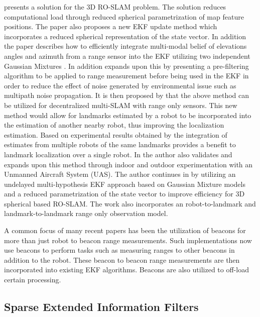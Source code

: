 \documentclass[conference]{IEEEtran}
\begin{document}
	
	
	\cite{Fabresse2013} presents a solution for the 3D RO-SLAM problem. The solution reduces computational load through reduced spherical parametrization of map feature positions. The paper also proposes a new EKF update method which incorporates a reduced spherical representation of the state vector. In addition the paper describes how to efficiently integrate multi-modal belief of elevations angles and azimuth from a range sensor into the EKF utilizing two independent Gaussian Mixtures \cite{Fabresse2013}. In addition \cite{Fabresse2014} expands upon this by presenting a pre-filtering algorithm to be applied to range measurement before being used in the EKF in order to reduce the effect of noise generated by environmental issue such as multipath noise propagation. It is then proposed by \cite{Fabresse2015} that the above method can be utilized for decentralized multi-SLAM with range only sensors. This new method would allow for landmarks estimated by a robot to be incorporated into the estimation of another nearby robot, thus improving the localization estimation. Based on experimental results obtained by \cite{Fabresse2015} the integration of estimates from multiple robots of the same landmarks provides a benefit to landmark localization over a single robot. In \cite{Fabresse2016} the author also validates and expands upon this method through indoor and outdoor experimentation with an Unmanned Aircraft System (UAS). The author continues in \cite{R.Fabresse2018} by utilizing an undelayed multi-hypothesis EKF approach based on Gaussian Mixture models and a reduced parametrization of the state vector to improve efficiency for 3D spherical based RO-SLAM. The work also incorporates an robot-to-landmark and landmark-to-landmark range only observation model. 
	
	
	A common focus of many recent papers has been the utilization of beacons for more than just robot to beacon range measurements. Such implementations now use beacons to perform tasks such as measuring ranges to other beacons in addition to the robot. These beacon to beacon range measurements are then incorporated into existing EKF algorithms. Beacons are also utilized to off-load certain processing.
	
\subsection{Sparse Extended Information Filters}
\end{document}
